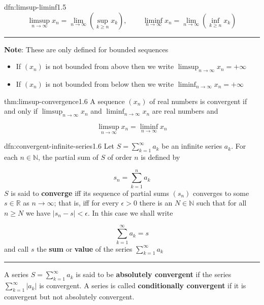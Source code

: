 \documentclass[landscape, 8pt]{extarticle}
\begin{document}
\begin{multicols}{3}
\begin{dfn}{dfn:limsup-liminf}{1.5}
	\[\limsup_{{n\to\infty}} x_{n} = \lim_{n \to \infty} \left(\displaystyle \sup_{k\ge n} x_{k}\right),\,\qquad \liminf_{{n\to\infty}} x_{n} = \lim_{n \to \infty} \left(\displaystyle \inf_{k\ge n} x_{k}\right)\]

	\noindent\rule{\textwidth}{0.2pt}
	\textbf{Note}: These are only defined for bounded sequences

	\begin{itemize}
		\setlength\itemsep{0em}
		\item If $(x_{n})$ is not bounded from above then we write $\limsup_{n \to \infty} x_{n} = +\infty$

		\item If $(x_{n})$ is not bounded from below then we write $\liminf_{n \to \infty} x_{n} = +\infty$
	\end{itemize}
\end{dfn}

\begin{thm}{thm:limsup-convergence}{1.6}
	A sequence $(x_{n})$ of real numbers is convergent if and only if $\limsup_{n \to \infty}x_{n}$ and $\liminf_{n \to \infty}x_{n}$ are real numbers and

	\[\limsup_{n \to \infty} x_{n} = \liminf_{n \to \infty} x_{n}\]
\end{thm}

\begin{dfn}{dfn:convergent-infinite-series}{1.6}
	Let $S=\sum_{k=1}^{\infty}a_{k}$ be an infinite series $a_{k}$. For each $n\in\mathbb{N}$, the partial sum of $S$ of order $n$ is defined by

	\[s_{n} = \sum_{k=1}^{n} a_{k}\]
	$S$ is said to \textbf{converge} iff its sequence of partial sums $(s_{n})$ converges to some $s \in\mathbb{R}$ as $n\to\infty$; that is, iff for every $\epsilon>0$ there is an $N\in\mathbb{N}$ such that for all $n\ge N$ we have $\lvert s_{n}-s \rvert < \epsilon$. In this case we shall write

	\[\sum_{k=1}^{\infty} a_{k} = s\]
	and call $s$ the \textbf{sum} or \textbf{value} of the series $\sum_{k=1}^{\infty}a_{k}$

	\noindent\rule{\textwidth}{0.2pt}

	A series $S=\sum_{k=1}^{\infty}a_{k}$ is said to be \textbf{absolutely convergent} if the series $\sum_{k=1}^{\infty}\lvert a_{k} \rvert$ is convergent. A series is called \textbf{conditionally convergent} if it is convergent but not absolutely convergent.
\end{dfn}



\end{multicols}
\end{document}
